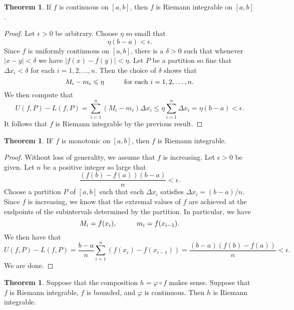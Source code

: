 \documentclass[12pt]{article}
\theoremstyle{definition}
\theoremstyle{theorem}
\newtheorem{theorem}[definition]{Theorem}
\begin{document}
\begin{theorem}
If $f$ is continuous on $[a,b]$, then $f$ is Riemann integrable on $[a,b]$. 
\end{theorem}

\begin{proof}
Let $\epsilon > 0$ be arbitrary. Choose $\eta$ so small that 
\[
\eta (b - a) < \epsilon.
\]
Since $f$ is uniformly continuous on $[a,b]$, there is a $\delta > 0$ such that whenever $|x - y| < \delta$ we have $|f(x) - f(y)| < \eta$. Let $P$ be a partition so fine that $\Delta x_i < \delta$ for each $i =1, 2, \ldots, n$. Then the choice of $\delta$ shows that 
\[
M_i - m_i \leqslant \eta \hspace{10mm} \text{for each $i=1, 2, \ldots, n$.}
\]
We then compute that 
\[
U(f, P) - L(f,P) = \sum_{i=1}^n (M_i - m_i) \Delta x_i \leqslant \eta \sum_{i=1}^n \Delta x_i = \eta(b-a) < \epsilon.
\]
It follows that $f$ is Riemann integrable by the previous result. 
\end{proof}

\begin{theorem}
IF $f$ is monotonic on $[a,b]$, then $f$ is Riemann integrable. 
\end{theorem}

\begin{proof}
Without loss of generality, we assume that $f$ is increasing. Let $\epsilon > 0$ be given. Let $n$ be a positive integer so large that 
\[
\frac{(f(b) - f(a))(b-a)}{n} < \epsilon.
\] 
Choose a partition $P$ of $[a,b]$ such that each $\Delta x_i$ satisfies $\Delta x_i = (b-a)/n$.   Since $f$ is increasing, we know that the extremal values of $f$ are achieved at the endpoints of the subintervals determined by the partition.  In particular, we have 
\[
M_i = f(x_i), \hspace{10mm} m_i = f(x_{i-1}).
\]
We then have that 
\[
U(f,P) - L(f,P) = \frac{b-a}{n}\sum_{i=1}^n (f(x_i) - f(x_{i-1})) = \frac{(b-a)(f(b) - f(a))}{n} < \epsilon.
\]
We are done. 
\end{proof}

\begin{theorem}\label{thm:intphi}
Suppose that the composition $h = \varphi \circ f$ makes sense. Suppose that $f$ is Riemann integrable, $f$ is bounded, and $\varphi$ is continuous. Then $h$ is Riemann integrable. 
\end{theorem}
\end{document}
